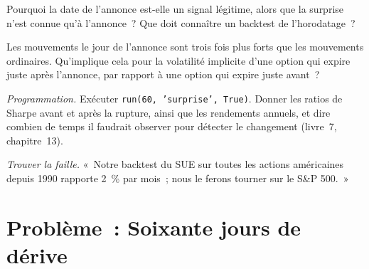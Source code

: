\begin{exercise}[$\star\star$]\label{exo:s1:earnings:5}
Pourquoi la date de l'annonce est-elle un signal légitime, alors que la surprise n'est connue qu'à l'annonce~? Que doit connaître un backtest de l'horodatage~?
\end{exercise}

\begin{exercise}[$\star\star$]\label{exo:s1:earnings:6}
Les mouvements le jour de l'annonce sont trois fois plus forts que les mouvements ordinaires. Qu'implique cela pour la volatilité implicite d'une option qui expire juste après l'annonce,
par rapport à une option qui expire juste avant~?
\end{exercise}

\begin{exercise}[$\star\star\star$]\label{exo:s1:earnings:7}
\emph{Programmation.} Exécuter \texttt{run(60, 'surprise', True)}. Donner les ratios de Sharpe avant et après la rupture, ainsi que les rendements annuels, et dire combien de temps
il faudrait observer pour détecter le changement (livre~7, chapitre~13).
\end{exercise}

\begin{exercise}[$\star\star\star$]\label{exo:s1:earnings:8}
\emph{Trouver la faille.} «~Notre backtest du SUE sur toutes les actions américaines depuis 1990 rapporte 2~\% par mois~; nous le ferons tourner sur le S\&P 500.~»
\end{exercise}

\section{Problème~: Soixante jours de dérive}

